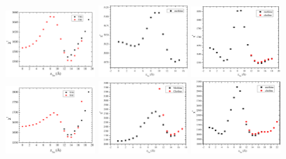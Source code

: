 \begin{figure}[htbp]
  \centering
  \includegraphics[width=0.3\textwidth]{figures/Tat/SDP_Results/X2/DOPC_Tat_62to1_3p0_X2}
  \includegraphics[width=0.3\textwidth]{figures/Tat/SDP_Results/X2/DOPCDOPE3to1_Tat_62to1_3p0_X2}
  \includegraphics[width=0.3\textwidth]{figures/Tat/SDP_Results/X2/DOPCDOPE1to1_Tat_62to1_3p0_X2}
  \includegraphics[width=0.3\textwidth]{figures/Tat/SDP_Results/X2/DOPC_Tat_28to1_3p0_X2}
  \includegraphics[width=0.3\textwidth]{figures/Tat/SDP_Results/X2/DOPCDOPE3to1_Tat_28to1_3p0_X2}
  \includegraphics[width=0.3\textwidth]{figures/Tat/SDP_Results/X2/DOPCDOPE1to1_Tat_28to1_3p0_X2}

\end{figure}
